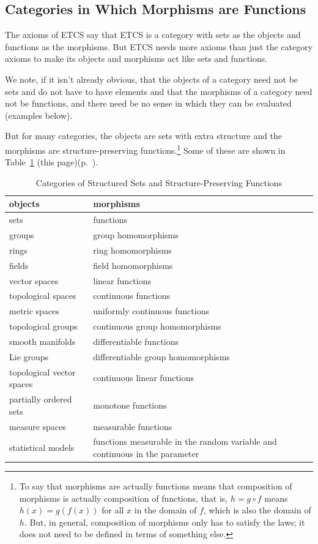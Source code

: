\documentclass[11pt]{article}
\begin{document}
\subsection{Categories in Which Morphisms are Functions}

The axioms of ETCS say that ETCS is a category with sets as the objects
and functions as the morphisms.  But ETCS needs more axioms than just
the category axioms to make its
objects and morphisms act like sets and functions.

We note, if it isn't already obvious, that the objects of a category need
not be sets and do not have to have elements and that the morphisms of a
category need not be functions, and there need be no sense in which they
can be evaluated (examples below).

But for many categories, the objects are sets with extra structure and the
morphisms are structure-preserving functions.\footnote{To say that morphisms
are actually functions means that composition of morphisms is actually
composition of functions, that is, $h = g \circ f$ means $h(x) = g(f(x))$
for all $x$ in the domain of $f$, which is also the domain of $h$.
But, in general, composition of morphisms only has to satisfy
the laws; it does not need to be defined in terms of something else.}
Some of these are shown in Table~\ref{tab:categories}
{(this page)}{(p.~\pageref{tab:categories})}.
\begin{table}
\caption{Categories of Structured Sets and Structure-Preserving Functions}
\begin{center}
\begin{tabular}{lp{2.75in}}
objects & morphisms \\
\hline
sets & functions \\
groups & group homomorphisms \\
rings & ring homomorphisms \\
fields & field homomorphisms \\
vector spaces & linear functions \\
topological spaces & continuous functions \\
metric spaces & uniformly continuous functions \\
topological groups & continuous group homomorphisms \\
smooth manifolds & differentiable functions \\
Lie groups & differentiable group homomorphisms \\
topological vector spaces & continuous linear functions \\
partially ordered sets & monotone functions \\
measure spaces & measurable functions \\
statistical models & functions measurable in the random variable
    and continuous in the parameter
\end{tabular}
\end{center}
\label{tab:categories}
\end{table}
\end{document}
